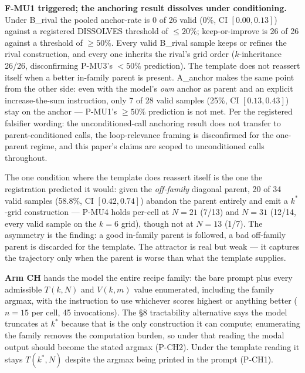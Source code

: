 \documentclass[11pt]{article}
\begin{document}
\textbf{F-MU1 triggered; the anchoring result dissolves under conditioning.} Under B\_rival
the pooled anchor-rate is 0 of 26 valid (0\%, CI $[0.00, 0.13]$) against a registered
DISSOLVES threshold of $\le 20\%$; keep-or-improve is 26 of 26 against a threshold of
$\ge 50\%$. Every valid B\_rival sample keeps or refines the rival construction, and every one
inherits the rival's grid order ($k$-inheritance 26/26, disconfirming P-MU3's $< 50\%$
prediction). The template does not reassert itself when a better in-family parent is present.
A\_anchor makes the same point from the other side: even with the model's \textit{own} anchor
as parent and an explicit increase-the-sum instruction, only 7 of 28 valid samples (25\%,
CI $[0.13, 0.43]$) stay on the anchor --- P-MU1's $\ge 50\%$ prediction is not met. Per the
registered falsifier wording: the unconditioned-call anchoring result does not transfer to
parent-conditioned calls, the loop-relevance framing is disconfirmed for the one-parent
regime, and this paper's claims are scoped to unconditioned calls throughout.

The one condition where the template does reassert itself is the one the registration
predicted it would: given the \textit{off-family} diagonal parent, 20 of 34 valid samples
(58.8\%, CI $[0.42, 0.74]$) abandon the parent entirely and emit a $k^{*}$-grid construction
--- P-MU4 holds per-cell at $N = 21$ (7/13) and $N = 31$ (12/14, every valid sample on the
$k = 6$ grid), though not at $N = 13$ (1/7). The asymmetry is the finding: a good in-family
parent is followed, a bad off-family parent is discarded for the template. The attractor is
real but weak --- it captures the trajectory only when the parent is worse than what the
template supplies.

\textbf{Arm CH} hands the model the entire recipe family: the bare prompt plus every
admissible $T(k, N)$ and $V(k, m)$ value enumerated, including the family argmax, with the
instruction to use whichever scores highest or anything better ($n = 15$ per cell, 45
invocations). The \S8 tractability alternative says the model truncates at $k^{*}$ because
that is the only construction it can compute; enumerating the family removes the computation
burden, so under that reading the modal output should become the stated argmax (P-CH2). Under
the template reading it stays $T(k^{*}, N)$ despite the argmax being printed in the prompt
(P-CH1).
\end{document}
